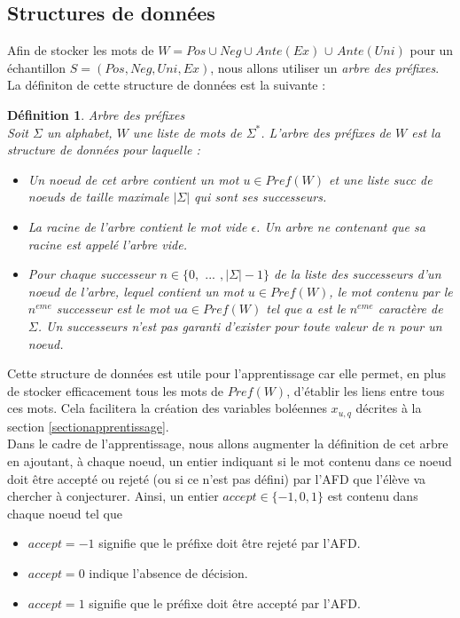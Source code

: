 \documentclass[12pt,a4paper,oneside,titlepage]{report}
\newtheorem{defi}{D\'efinition}[section]
\begin{document}
\subsection{Structures de données}
Afin de stocker les mots de $W=Pos\cup Neg\cup Ante(Ex)$ $\cup$ $Ante(Uni)$ pour un échantillon $S=(Pos, Neg, Uni, Ex)$, nous allons utiliser un \emph{arbre des préfixes}. La définiton de cette structure de données est la suivante :
\begin{defi}{Arbre des préfixes\\}
\label{prefixtree}
Soit $\Sigma$ un alphabet, $W$ une liste de mots de $\Sigma^*$. L'\emph{arbre des préfixes} de $W$ est la structure de données pour laquelle :
\begin{itemize}
\item Un \emph{noeud} de cet arbre contient un mot $u\in Pref(W)$ et une liste \emph{succ} de noeuds de taille maximale $|\Sigma|$ qui sont ses successeurs.
\item La racine de l'arbre contient le mot vide $\epsilon$. Un arbre ne contenant que sa racine est appelé l'\emph{arbre vide}.
\item Pour chaque successeur $n\in\{0,$ $...$ $,|\Sigma|-1\}$ de la liste des successeurs d'un noeud de l'arbre, lequel contient un mot $u\in Pref(W)$, le mot contenu par le $n^{eme}$ successeur est le mot $ua\in Pref(W)$ tel que $a$ est le $n^{eme}$ caractère de $\Sigma$. Un successeurs n'est pas garanti d'exister pour toute valeur de $n$ pour un noeud.
\end{itemize}
\end{defi}
\noindent Cette structure de données est utile pour l'apprentissage car elle permet, en plus de stocker efficacement tous les mots de $Pref(W)$, d'établir les liens entre tous ces mots. Cela facilitera la création des variables boléennes $x_{u,q}$ décrites à la section \ref{sectionapprentissage}. \\
Dans le cadre de l'apprentissage, nous allons augmenter la définition de cet arbre en ajoutant, à chaque noeud, un entier indiquant si le mot contenu dans ce noeud doit être accepté ou rejeté (ou si ce n'est pas défini) par l'AFD que l'élève va chercher à conjecturer. Ainsi, un  entier $accept\in\{-1, 0, 1\}$ est contenu dans chaque noeud tel que
\begin{itemize}
\item $accept=-1$ signifie que le préfixe doit être rejeté par l'AFD.
\item $accept=0$ indique l'absence de décision.
\item $accept=1$ signifie que le préfixe doit être accepté par l'AFD.\\
\end{itemize}
\end{document}

